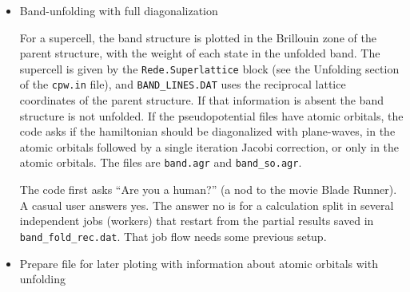\documentclass[11pt]{article}
\begin{document}
\begin{itemize}
   The code first asks how many interpolation points you want between calculated points.
   Notice that the values in \texttt{BAND\_LINES.DAT} that control the number of k-points
   is {\it after} interpolation.  Besides the starting and end points on each pannel,
   you need to calculate a few (1 to 3) intermediate points to have a good interpolation,
   so the answer to that quaetion depends on how many final points you are going to have.
   The speedup in computing time is almost the number of intermediate points.
   Accuracy and computing time are again the compromises you have to take.

   The code than asks if you want to accept the defaults of the calculation.
   If unsure accept the defaults.  Otherwise read the code and the relevant article.

   This option only produces the \texttt{grace} figures.  They have an added \texttt{\_lk\_int}
   to the file names.  There is also a \texttt{band\_lk\_ref.agr} file with the reference (fully calculated)
   bands.  It should have visible straight lines if you are using the method efficiently.

   \item{Band-unfolding with full diagonalization}

   For a supercell, the band structure is plotted in the Brillouin zone of the parent
   structure, with the weight of each state in the unfolded band.  The supercell
   is given by the \texttt{Rede.Superlattice} block (see the Unfolding section of the
   \texttt{cpw.in} file), and \texttt{BAND\_LINES.DAT} uses the reciprocal
   lattice coordinates of the parent structure.  If that information is absent the
   band structure is not unfolded.
   If the pseudopotential files have atomic orbitals, the code asks if the hamiltonian
   should be diagonalized with plane-waves, in the atomic orbitals followed by a single
   iteration Jacobi correction, or only in the atomic orbitals.  The files are \texttt{band.agr} and
   \texttt{band\_so.agr}.

   The code first asks ``Are you a human?'' (a nod to the movie Blade Runner).
   A casual user answers yes.  The answer no is for a calculation split in several
   independent jobs (workers) that restart from the partial results saved in
   \texttt{band\_fold\_rec.dat}.  That job flow needs some previous setup.

   \item{Prepare file for later ploting with information about atomic orbitals with unfolding}


\end{itemize}
\end{document}
